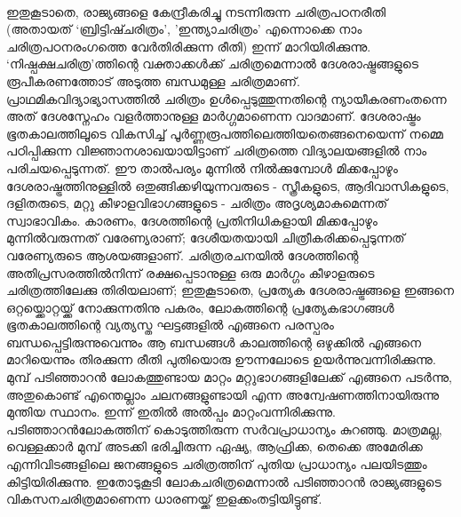 \paragraph{}		ഇതുകൂടാതെ, രാജ്യങ്ങളെ കേന്ദ്രീകരിച്ചു നടന്നിരുന്ന ചരിത്രപഠനരീതി (അതായത് `ബ്രിട്ടിഷ്ചരിത്രം', 'ഇന്ത്യാചരിത്രം' എന്നൊക്കെ നാം ചരിത്രപഠനരംഗത്തെ വേർതിരിക്കുന്ന രീതി) ഇന്ന് മാറിയിരിക്കുന്നു. `നിഷ്പക്ഷചരിത്ര'ത്തിന്റെ വക്താക്കൾക്ക് ചരിത്രമെന്നാൽ ദേശരാഷ്ട്രങ്ങളുടെ രൂപീകരണത്തോട് അടുത്ത ബന്ധമുള്ള ചരിത്രമാണ്. പ്രാഥമികവിദ്യാഭ്യാസത്തിൽ ചരിത്രം ഉൾപ്പെടുത്തുന്നതിന്റെ ന്യായീകരണംതന്നെ അത് ദേശസ്നേഹം വളർത്താനുള്ള മാർഗ്ഗമാണെന്ന വാദമാണ്. ദേശരാഷ്ട്രം ഭൂതകാലത്തിലൂടെ വികസിച്ച് പൂർണ്ണരൂപത്തിലെത്തിയതെങ്ങനെയെന്ന് നമ്മെ പഠിപ്പിക്കുന്ന വിജ്ഞാനശാഖയായിട്ടാണ് ചരിത്രത്തെ വിദ്യാലയങ്ങളിൽ നാം പരിചയപ്പെടുന്നത്. ഈ താൽപര്യം മുന്നിൽ നിൽക്കുമ്പോൾ മിക്കപ്പോഴും ദേശരാഷ്ട്രത്തിനുള്ളിൽ ഒതുങ്ങിക്കഴിയുന്നവരുടെ - സ്ത്രീകളുടെ, ആദിവാസികളുടെ, ദളിതരുടെ, മറ്റു കീഴാളവിഭാഗങ്ങളുടെ - ചരിത്രം അദൃശ്യമാകുമെന്നത് സ്വാഭാവികം. കാരണം, ദേശത്തിന്റെ പ്രതിനിധികളായി മിക്കപ്പോഴും മുന്നിൽവരുന്നത് വരേണ്യരാണ്; ദേശീയതയായി ചിത്രീകരിക്കപ്പെടുന്നത് വരേണ്യരുടെ ആശയങ്ങളാണ്. ചരിത്രരചനയിൽ ദേശത്തിന്റെ അതിപ്രസരത്തിൽനിന്ന് രക്ഷപ്പെടാനുള്ള ഒരു മാർഗ്ഗം കീഴാളരുടെ ചരിത്രത്തിലേക്കു തിരിയലാണ്; ഇതുകൂടാതെ, പ്രത്യേക ദേശരാഷ്ട്രങ്ങളെ ഇങ്ങനെ ഒറ്റയ്ക്കൊറ്റയ്ക്ക് നോക്കുന്നതിനു പകരം, ലോകത്തിന്റെ പ്രത്യേകഭാഗങ്ങൾ ഭൂതകാലത്തിന്റെ വ്യത്യസ്ത ഘട്ടങ്ങളിൽ എങ്ങനെ പരസ്പരം ബന്ധപ്പെട്ടിരുന്നുവെന്നും ആ ബന്ധങ്ങൾ കാലത്തിന്റെ ഒഴുക്കിൽ എങ്ങനെ മാറിയെന്നും തിരക്കുന്ന രീതി പുതിയൊരു ഊന്നലോടെ ഉയർന്നുവന്നിരിക്കുന്നു. മുമ്പ് പടിഞ്ഞാറൻ ലോകത്തുണ്ടായ മാറ്റം മറ്റുഭാഗങ്ങളിലേക്ക് എങ്ങനെ പടർന്നു, അതുകൊണ്ട് എന്തെല്ലാം ചലനങ്ങളുണ്ടായി എന്ന അന്വേഷണത്തിനായിരുന്നു മുന്തിയ സ്ഥാനം. ഇന്ന് ഇതിൽ അൽപ്പം മാറ്റംവന്നിരിക്കുന്നു. പടിഞ്ഞാറൻലോകത്തിന് കൊടുത്തിരുന്ന സർവപ്രാധാന്യം കുറഞ്ഞു. മാത്രമല്ല, വെള്ളക്കാർ മുമ്പ് അടക്കി ഭരിച്ചിരുന്ന ഏഷ്യ, ആഫ്രിക്ക, തെക്കെ അമേരിക്ക എന്നിവിടങ്ങളിലെ ജനങ്ങളുടെ ചരിത്രത്തിന് പുതിയ പ്രാധാന്യം പലയിടത്തും കിട്ടിയിരിക്കുന്നു. ഇതോടുകൂടി ലോകചരിത്രമെന്നാൽ പടിഞ്ഞാറൻ രാജ്യങ്ങളുടെ വികസനചരിത്രമാണെന്ന ധാരണയ്ക്ക് ഇളക്കംതട്ടിയിട്ടുണ്ട്.

